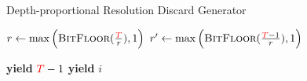\begin{algorithm}
\caption{Depth-proportional Resolution Discard Generator}
\label{alg:depth-proportional-resolution-algo-gen-drop-ranks}
\begin{algorithmic}[1]
    \Ensure{ $\colorTbar \in [0 \twodots \colorT)$ -- data items to drop, if any }

    \State $r \gets \max\Big(\Call{BitFloor}{\frac{\colorT}{r}}, 1\Big)$
    \State $r' \gets \max\Big(\Call{BitFloor}{\frac{\colorT - 1}{r}}, 1\Big)$

        \State \textbf{yield} $\colorT - 1$
    \EndIf
            \State \textbf{yield} $i$
        \EndFor
    \EndIf
\end{algorithmic}
\end{algorithm}
